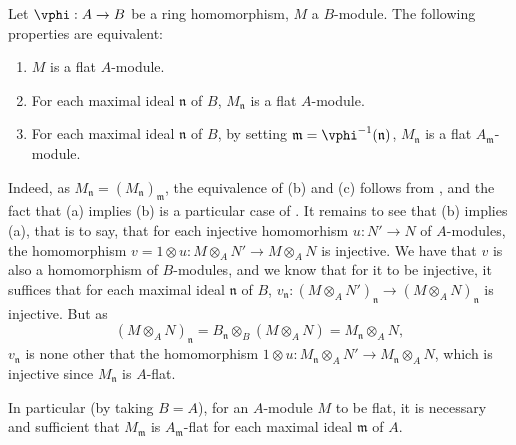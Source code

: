 \begin{env}[6.3.3]
\label{0.6.3.3}
Let $\vphi:A\to B$ be a ring homomorphism, $M$ a $B$-module. The following
properties are equivalent:
\begin{enumerate}
  \item[(a)] $M$ is a flat $A$-module.
  \item[(b)] For each maximal ideal $\mathfrak{n}$ of $B$, $M_\mathfrak{n}$ is a flat $A$-module.
  \item[(c)] For each maximal ideal $\mathfrak{n}$ of $B$, by setting
    $\mathfrak{m}=\vphi^{-1}(\mathfrak{n})$, $M_\mathfrak{n}$ is a flat $A_\mathfrak{m}$-module.
\end{enumerate}

Indeed, as $M_\mathfrak{n}=(M_\mathfrak{n})_\mathfrak{m}$, the equivalence of
(b) and (c) follows from , and the fact that (a) implies (b) is
a particular case of . It remains to see that (b) implies (a),
that is to say, that for each injective homomorhism $u:N'\to N$ of $A$-modules, the
homomorphism $v=1\otimes u:M\otimes_A N'\to M\otimes_A N$ is injective. We have that $v$ is
also a homomorphism of $B$-modules, and we know that for it to be injective, it suffices that
for each maximal ideal $\mathfrak{n}$ of $B$,
$v_\mathfrak{n}:(M\otimes_A N')_\mathfrak{n}\to(M\otimes_A N)_\mathfrak{n}$ is injective. But
as
\[
  (M\otimes_A N)_\mathfrak{n}=B_\mathfrak{n}\otimes_B(M\otimes_A N)
  =M_\mathfrak{n}\otimes_A N,
\]
$v_\mathfrak{n}$ is none other that the homomorphism
$1\otimes u:M_\mathfrak{n}\otimes_A N'\to M_\mathfrak{n}\otimes_A N$, which is injective
since $M_\mathfrak{n}$ is $A$-flat.

In particular (by taking $B=A$), for an $A$-module $M$ to be flat, it is necessary and
sufficient that $M_\mathfrak{m}$ is $A_\mathfrak{m}$-flat for each maximal ideal
$\mathfrak{m}$ of $A$.
\end{env}

